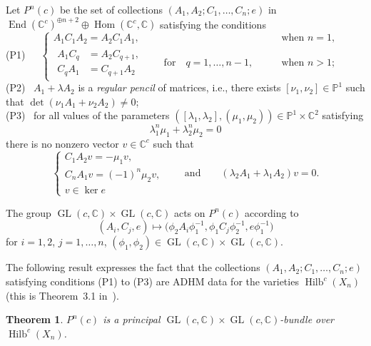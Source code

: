 \documentclass[11pt]{article}
\numberwithin{equation}{section}
\numberwithin{equation}{section}
\newtheorem{Theorem}{Theorem}[section]
\begin{document}
\setcounter{equation}{1}
Let $P^{n}(c)$ be the set of collections $(A_1,A_2;C_1,\dots,C_{n};e)$
in $\operatorname{End}(\mathbb{C}^{c})^{\oplus n+2}\oplus\operatorname{Hom}(\mathbb{C}^{c},\mathbb{C})$ sa\-tisfying the conditions\\[8pt]
(P1)\ \ \
$\displaystyle
\begin{cases}
A_1C_1A_{2}=A_2C_{1}A_{1},&\qquad\text{when $n=1$},\\[2pt]
\begin{aligned}
A_1C_q&=A_2C_{q+1},\\
C_qA_1&=C_{q+1}A_2
\end{aligned}
\qquad\text{for}\quad q=1,\dots,n-1,&\qquad\text{when $n>1$;}
\end{cases}
$
\\[8pt]
(P2) \
$A_1+\lambda A_2$ is a \emph{regular pencil} of matrices, i.e., there exists $[\nu_{1},\nu_{2}]\in\mathbb{P}^1$ such that $\det(\nu_1A_1+\nu_2A_2)\neq0$;
\\[8pt]
(P3) \
for all values of the parameters $ ([\lambda_1,\lambda_2],(\mu_1,\mu_{2}) )\in\mathbb{P}^1\times\mathbb{C}^{2}$ satisfying
\begin{equation*}
\lambda_{1}^{n}\mu_{1}+\lambda_{2}^{n}\mu_{2}=0
\end{equation*}
there is no nonzero vector $v\in\mathbb{C}^c$ such that
\begin{equation*}
\begin{cases}
C_{1}A_{2}v=-\mu_1v,\\
C_{n}A_{1}v=(-1)^n\mu_2v,\\
v\in\ker e
\end{cases}
\qquad\text{and}\qquad\left(\lambda_2{A_1}+\lambda_1{A_2}\right)v=0 .
\end{equation*}

The group
$\operatorname{GL}(c, \mathbb{C})\times \operatorname{GL}(c, \mathbb{C})$ acts on $P^n(c)$ according to
\begin{equation*} (A_i, C_j, e ) \mapsto \big(\phi_2A_i\phi_1^{-1},\phi_1C_j\phi_2^{-1}, e\phi_1^{-1}\big)
\end{equation*}
for $i=1,2$, $j=1,\dots,n$, $ (\phi_1,\phi_2)\in\operatorname{GL}(c, \mathbb{C})\times \operatorname{GL}(c, \mathbb{C})$.

 The following result expresses the fact that the collections $(A_1,A_2;C_1,\dots,C_{n};e)$ satisfying
 conditions (P1) to (P3) are ADHM data for the varieties $\operatorname{Hilb}^c (X_{n})$ (this is Theorem~3.1 in~\cite{bbr}).
 \begin{Theorem}\label{thm0}
$P^{n}(c)$ is a principal $\operatorname{GL}(c, \mathbb{C})\times \operatorname{GL}(c, \mathbb{C})$-bundle over $\operatorname{Hilb}^c (X_{n})$.
\end{Theorem}
\end{document}
